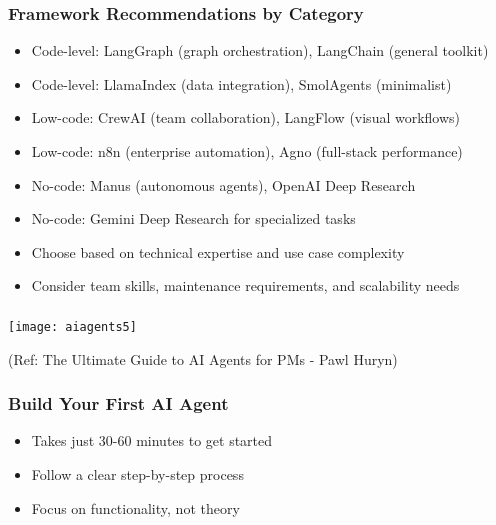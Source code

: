 \begin{frame}[fragile]\frametitle{Framework Recommendations by Category}
      \begin{itemize}
	  \item Code-level: LangGraph (graph orchestration), LangChain (general toolkit)
	  \item Code-level: LlamaIndex (data integration), SmolAgents (minimalist)
	  \item Low-code: CrewAI (team collaboration), LangFlow (visual workflows)
	  \item Low-code: n8n (enterprise automation), Agno (full-stack performance)
	  \item No-code: Manus (autonomous agents), OpenAI Deep Research
	  \item No-code: Gemini Deep Research for specialized tasks
	  \item Choose based on technical expertise and use case complexity
	  \item Consider team skills, maintenance requirements, and scalability needs
	  \end{itemize}
\end{frame}










\begin{frame}[fragile]\frametitle{}

\begin{center}
\texttt{[image: aiagents5]}

{\tiny (Ref: The Ultimate Guide to AI Agents for PMs - Pawl Huryn)}
\end{center}	
  
\end{frame}

\begin{frame}[fragile]\frametitle{Build Your First AI Agent}
      \begin{itemize}
        \item Takes just 30-60 minutes to get started
        \item Follow a clear step-by-step process
        \item Focus on functionality, not theory
      \end{itemize}
\end{frame}

